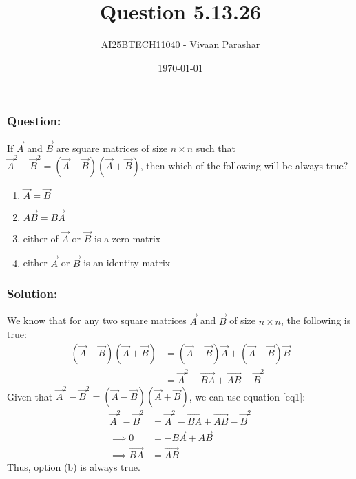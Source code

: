 \documentclass{beamer}
\title{Question 5.13.26}
\author{AI25BTECH11040 - Vivaan Parashar}
\date{\today}
\begin{document}
\frame{\titlepage}

\begin{frame}
    \frametitle{Question: }
    If $\vec{A}$ and $\vec{B}$ are square matrices of size $n \times n$ such that $\vec{A}^2 - \vec{B}^2 = (\vec{A} - \vec{B}) (\vec{A} + \vec{B})$, then which of the following will be always true?
    \begin{enumerate}[label=(\alph*)]
        \item $\vec{A} = \vec{B}$
        \item $\vec{AB} = \vec{BA}$
        \item either of $\vec{A}$ or $\vec{B}$ is a zero matrix
        \item either $\vec{A}$ or $\vec{B}$ is an identity matrix
    \end{enumerate}
\end{frame}

\begin{frame}
    \frametitle{Solution: }
    We know that for any two square matrices $\vec{A}$ and $\vec{B}$ of size $n \times n$, the following is true:
    \begin{align}
        (\vec{A} - \vec{B}) (\vec{A} + \vec{B}) & = (\vec{A} - \vec{B})\vec{A} + (\vec{A} - \vec{B})\vec{B} \\
                                                & = \vec{A}^2 - \vec{BA} + \vec{AB} - \vec{B}^2 \label{eq1}
    \end{align}
    Given that $\vec{A}^2 - \vec{B}^2 = (\vec{A} - \vec{B}) (\vec{A} + \vec{B})$, we can use equation \ref{eq1}:
    \begin{align}
        \vec{A}^2 - \vec{B}^2 & = \vec{A}^2 - \vec{BA} + \vec{AB} - \vec{B}^2 \\
        \implies 0            & = - \vec{BA} + \vec{AB}                       \\
        \implies \vec{BA}     & = \vec{AB}
    \end{align}
    Thus, option (b) is always true.
\end{frame}
\end{document}
